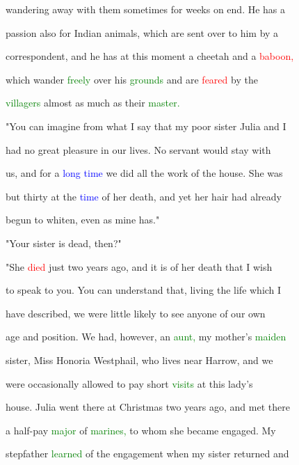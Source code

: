  wandering away with them sometimes for weeks on end. He has a

 \textcolor{BurntOrange}{passion} also for Indian animals, which are sent over to him by a

 correspondent, and he has at this moment a cheetah and a \textcolor{red}{baboon,}

 which wander \textcolor{green}{freely} over his \textcolor{green}{grounds} and are \textcolor{red}{feared} by the

 \textcolor{green}{villagers} almost as much as their \textcolor{green}{master.}



 "You can imagine from what I say that my poor sister Julia and I

 had no great pleasure in our lives. No \textcolor{BurntOrange}{servant} would stay with

 us, and for a \textcolor{blue}{long} \textcolor{blue}{time} we did all the work of the house. She was

 but thirty at the \textcolor{blue}{time} of her \textcolor{BurntOrange}{death,} and yet her hair had already

 begun to whiten, even as mine has."



 "Your sister is dead, then?"



 "She \textcolor{red}{died} just two years ago, and it is of her \textcolor{BurntOrange}{death} that I wish

 to speak to you. You can understand that, living the life which I

 have described, we were little likely to see anyone of our own

 age and position. We had, however, an \textcolor{green}{aunt,} my \textcolor{BurntOrange}{mother's} \textcolor{green}{maiden}

 sister, Miss Honoria Westphail, who lives near Harrow, and we

 were occasionally allowed to \textcolor{BurntOrange}{pay} short \textcolor{green}{visits} at this lady's

 house. Julia went there at Christmas two years ago, and met there

 a half-pay \textcolor{green}{major} of \textcolor{green}{marines,} to whom she became engaged. My

 stepfather \textcolor{green}{learned} of the engagement when my sister returned and

